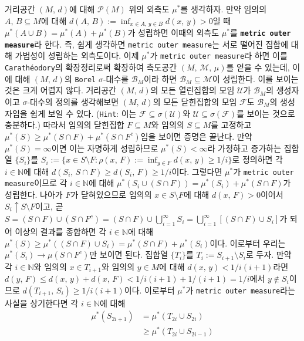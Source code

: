 \begin{enumerate}[label = \textsf{\textbf{\arabic*}}]
    거리공간 $(M,\,d)$에 대해 $\mathcal{P}(M)$ 위의 외측도 $\mu^*$를 생각하자. 만약 임의의 $A,\,B\subseteq M$에 대해 $d(A,\,B):=\inf_{x\in A,\,y\in B}d(x,\,y)>0$일 때 $\mu^*(A\cup B)=\mu^*(A)+\mu^*(B)$가 성립하면 이때의 외측도 $\mu^*$를 \textbf{\texttt{metric outer measure}}라 한다. 즉, 쉽게 생각하면 \texttt{metric outer measure}는 서로 떨어진 집합에 대해 가법성이 성립하는 외측도이다. 이제 $\mu^*$가 \texttt{metric outer measure}라 하면 이를 \texttt{Carath\'eodory}의 확장정리로써 확장하여 측도공간 $(M,\,\mathcal{M},\,\mu)$를 얻을 수 있는데, 이에 대해 $(M,\,d)$의 \texttt{Borel} $\sigma$-대수를 $\mathcal{B}_M$이라 하면 $\mathcal{B}_M\subseteq\mathcal{M}$이 성립한다. 이를 보이는 것은 크게 어렵지 않다. 거리공간 $(M,\,d)$의 모든 열린집합의 모임 $\mathcal{U}$가 $\mathcal{B}_M$의 생성자이고 $\sigma$-대수의 정의를 생각해보면 $(M,\,d)$의 모든 닫힌집합의 모임 $\mathcal{F}$도 $\mathcal{B}_M$의 생성자임을 쉽게 보일 수 있다. (\texttt{Hint}: 이는 $\mathcal{F}\subseteq\sigma(\mathcal{U})$와 $\mathcal{U}\subseteq\sigma(\mathcal{F})$를 보이는 것으로 충분하다.) 따라서 임의의 닫힌집합 $F\subseteq M$와 임의의 $S\subseteq M$를 고정하고 $\mu^*(S)\geq\mu^*(S\cap F)+\mu^*(S\cap F^c)$임을 보이면 증명은 끝난다. 만약 $\mu^*(S)=\infty$이면 이는 자명하게 성립하므로 $\mu^*(S)<\infty$라 가정하고 증가하는 집합열 $\{S_i\}$를 $S_i:=\{x\in S\setminus F:\rho(x,\,F):=\inf_{y\in F}d(x,\,y)\geq1/i\}$로 정의하면 각 $i\in\mathbb{N}$에 대해 $d(S_i,\,S\cap F)\geq d(S_i,\,F)\geq1/i$이다. 그렇다면 $\mu^*$가 \texttt{metric outer measure}이므로 각 $i\in\mathbb{N}$에 대해 $\mu^*(S_i\cup(S\cap F))=\mu^*(S_i)+\mu^*(S\cap F)$가 성립한다. 나아가 $F$가 닫혀있으므로 임의의 $x\in S\setminus F$에 대해 $d(x,\,F)>0$이어서 $S_i\uparrow S\setminus F$이고, 곧 $S=(S\cap F)\cup(S\cap F^c)=(S\cap F)\cup\bigcup_{i=1}^\infty S_i=\bigcup_{i=1}^\infty[(S\cap F)\cup S_i]$가 되어 이상의 결과를 종합하면 각 $i\in\mathbb{N}$에 대해 $\mu^*(S)\geq\mu^*((S\cap F)\cup S_i)=\mu^*(S\cap F)+\mu^*(S_i)$이다. 이로부터 우리는 $\mu^*(S_i)\to\mu(S\cap F^c)$만 보이면 된다. 집합열 $\{T_i\}$를 $T_i:=S_{i+1}\setminus S_i$로 두자. 만약 각 $i\in\mathbb{N}$와 임의의 $x\in T_{i+1}$와 임의의 $y\in M$에 대해 $d(x,\,y)<1/i(i+1)$라면 $d(y,\,F)\leq d(x,\,y)+d(x,\,F)<1/i(i+1)+1/(i+1)=1/i$에서 $y\notin S_i$이므로 $d(T_{i+1},\,S_i)\geq1/i(i+1)$이다. 이로부터 $\mu^*$가 \texttt{metric outer measure}라는 사실을 상기한다면 각 $i\in\mathbb{N}$에 대해
    \begin{align*}
        \mu^*(S_{2i+1})&=\mu^*(T_{2i}\cup S_{2i})\\
        &\geq\mu^*(T_{2i}\cup S_{2i-1})\\

\end{align*}
\end{enumerate}
